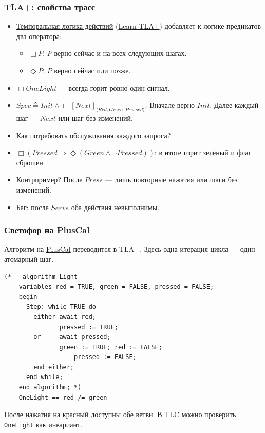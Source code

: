 \documentclass[11pt]{beamer}
\begin{document}
\begin{frame}
  \frametitle{TLA+: свойства трасс}
  \small
  \begin{itemize}
    \setlength{\itemsep}{0pt}
    \item \href{https://en.wikipedia.org/wiki/Temporal_logic_of_actions}{Темпоральная логика действий} (\href{https://www.learntla.com/index.html}{Learn TLA+}) добавляет к логике предикатов два оператора:
      \begin{itemize}
        \item $\Box P$: $P$ верно сейчас и на всех следующих шагах.
        \item $\Diamond P$: $P$ верно сейчас или позже.
      \end{itemize}
    \item $\Box\mathit{OneLight}$ — всегда горит ровно один сигнал.
    \item $\mathit{Spec} \triangleq \mathit{Init} \land \Box[\mathit{Next}]_{\langle\mathit{Red},\mathit{Green},\mathit{Pressed}\rangle}$. Вначале верно $\mathit{Init}$. Далее каждый шаг — $\mathit{Next}$ или шаг без изменений.
    \item Как потребовать обслуживания каждого запроса?
          \pause
    \item $\Box(\mathit{Pressed} \Rightarrow \Diamond(\mathit{Green} \land \neg\mathit{Pressed}))$:
          в итоге горит зелёный и флаг сброшен.
    \item Контрпример? \pause После $\mathit{Press}$ — лишь повторные нажатия или шаги без изменений.
    \item Баг:\pause{} после $\mathit{Serve}$ оба действия невыполнимы.
  \end{itemize}

\end{frame}

\begin{frame}[fragile]
  \frametitle{Светофор на PlusCal}
  \small Алгоритм на \href{https://lamport.azurewebsites.net/tla/pluscal.html}{PlusCal} переводится в TLA+. Здесь одна итерация цикла — один атомарный шаг.
  \begin{lstlisting}[style=specification,language=PlusCal]
    (* --algorithm Light
    variables red = TRUE, green = FALSE, pressed = FALSE;
    begin
      Step: while TRUE do
        either await red;
               pressed := TRUE;
        or     await pressed;
               green := TRUE; red := FALSE;
                   pressed := FALSE;
        end either;
      end while;
    end algorithm; *)
    OneLight == red /= green
  \end{lstlisting}
  После нажатия на красный доступны обе ветви. В TLC можно проверить \texttt{OneLight} как инвариант.
\end{frame}
\end{document}
